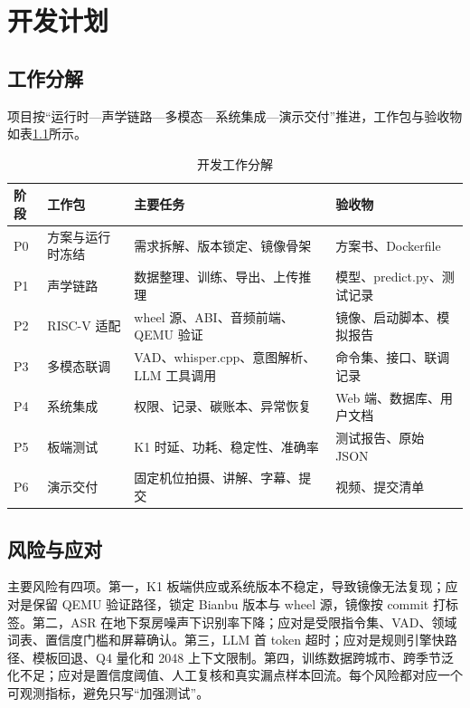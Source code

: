 \documentclass[lang=cn,11pt,scheme=chinese,chinesefont=nofont,color=green]{elegantbook}
\begin{document}
\chapter{开发计划}
\label{ch:plan}

\section{工作分解}

项目按“运行时—声学链路—多模态—系统集成—演示交付”推进，工作包与验收物如表\ref{tab:wbs}所示。

\begin{table}[htbp]
\centering
\small
\caption{开发工作分解}
\label{tab:wbs}
\begin{tabular}{p{1.4cm}p{3.6cm}p{6.0cm}p{3.0cm}}
\toprule
阶段 & 工作包 & 主要任务 & 验收物 \\
\midrule
P0 & 方案与运行时冻结 & 需求拆解、版本锁定、镜像骨架 & 方案书、Dockerfile \\
P1 & 声学链路 & 数据整理、训练、导出、上传推理 & 模型、predict.py、测试记录 \\
P2 & RISC-V 适配 & wheel 源、ABI、音频前端、QEMU 验证 & 镜像、启动脚本、模拟报告 \\
P3 & 多模态联调 & VAD、whisper.cpp、意图解析、LLM 工具调用 & 命令集、接口、联调记录 \\
P4 & 系统集成 & 权限、记录、碳账本、异常恢复 & Web 端、数据库、用户文档 \\
P5 & 板端测试 & K1 时延、功耗、稳定性、准确率 & 测试报告、原始 JSON \\
P6 & 演示交付 & 固定机位拍摄、讲解、字幕、提交 & 视频、提交清单 \\
\bottomrule
\end{tabular}
\end{table}

\section{风险与应对}

主要风险有四项。第一，K1 板端供应或系统版本不稳定，导致镜像无法复现；应对是保留 QEMU 验证路径，锁定 Bianbu 版本与 wheel 源，镜像按 commit 打标签。第二，ASR 在地下泵房噪声下识别率下降；应对是受限指令集、VAD、领域词表、置信度门槛和屏幕确认。第三，LLM 首 token 超时；应对是规则引擎快路径、模板回退、Q4 量化和 2048 上下文限制。第四，训练数据跨城市、跨季节泛化不足；应对是置信度阈值、人工复核和真实漏点样本回流。每个风险都对应一个可观测指标，避免只写“加强测试”。
\end{document}
